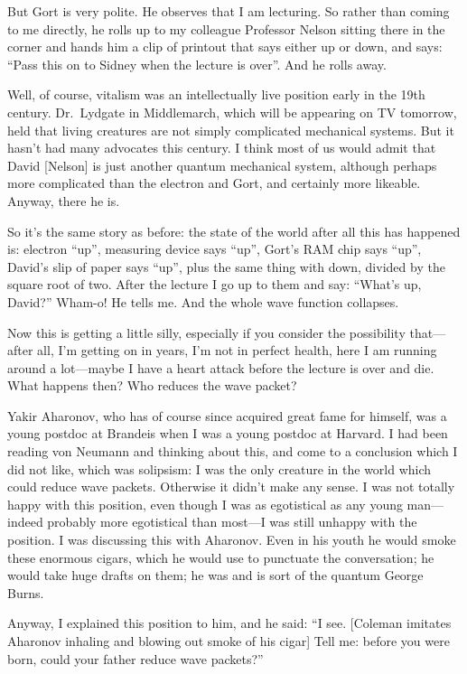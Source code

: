 \documentclass[12pt,nofootinbib]{revtex4}
\begin{document}
But Gort is very polite. He observes that I am lecturing. So rather than coming to me directly, he rolls up to my colleague Professor Nelson sitting there in the corner and hands him a clip of printout that says either up or down, and says: ``Pass this on to Sidney when the lecture is over''. And he rolls away.

Well, of course, vitalism was an intellectually live position early in the 19th century. Dr.\ Lydgate in Middlemarch, which will be appearing on TV tomorrow, held that living creatures are not simply complicated mechanical systems. But it hasn't had many advocates this century. I think most of us would admit that David [Nelson] is just another quantum mechanical system, although perhaps more complicated than the electron and Gort, and certainly more likeable. Anyway, there he is.

So it's the same story as before: the state of the world after all this has happened is: electron ``up'', measuring device says ``up'', Gort's RAM chip says ``up'', David's slip of paper says ``up'', plus the same thing with down, divided by the square root of two. After the lecture I go up to them and say: ``What's up, David?'' Wham-o! He tells me. And the whole wave function collapses.

Now this is getting a little silly, especially if you consider the possibility that---after all, I'm getting on in years, I'm not in perfect health, here I am running around a lot---maybe I have a heart attack before the lecture is over and die. What happens then? Who reduces the wave packet?

Yakir Aharonov, who has of course since acquired great fame for himself, was a young postdoc at Brandeis when I was a young postdoc at Harvard. I had been reading von Neumann and thinking about this, and come to a conclusion which I did not like, which was solipsism: I was the only creature in the world which could reduce wave packets. Otherwise it didn't make any sense. I was not totally happy with this position, even though I was as egotistical as any young man---indeed probably more egotistical than most---I was still unhappy with the position. I was discussing this with Aharonov. Even in his youth he would smoke these enormous cigars, which he would use to punctuate the conversation; he would take huge drafts on them; he was and is sort of the quantum George Burns.

Anyway, I explained this position to him, and he said: ``I see. [Coleman imitates Aharonov inhaling and blowing out smoke of his cigar] Tell me: before you were born, could your father reduce wave packets?''
\end{document}
